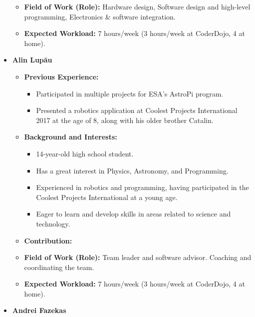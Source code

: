 \documentclass[11pt]{article}
\begin{document}
\begin{itemize}
\begin{itemize}[label=]
        \item[\faMicroscope] \textbf{Field of Work (Role):} Hardware design, Software design and high-level programming, Electronics \& software integration.
        \item[\faLaptopCode] \textbf{Expected Workload:} 7 hours/week (3 hours/week at CoderDojo, 4 at home).
    \end{itemize}
    \vspace{0.2 cm}
    \item[] \textbf{Alin Lup\u{a}u}
    \begin{itemize}[label=]
        \item[\faCogs] \textbf{Previous Experience:} 
        \begin{itemize}[label=]
            \item Participated in multiple projects for ESA's AstroPi program.
            \item Presented a robotics application at Coolest Projects International 2017 at the age of 8, along with his older brother Catalin.
        \end{itemize}
        \item[\faGraduationCap] \textbf{Background and Interests:} 
        \begin{itemize}[label=]
            \item 14-year-old high school student.
            \item Has a great interest in Physics, Astronomy, and Programming.
            \item Experienced in robotics and programming, having participated in the Coolest Projects International at a young age.
            \item Eager to learn and develop skills in areas related to science and technology.
        \end{itemize}
        \item[\faEdit] \textbf{Contribution:} 
        \item[\faMicroscope] \textbf{Field of Work (Role):} Team leader and software advisor. Coaching and coordinating the team.
        \item[\faLaptopCode] \textbf{Expected Workload:} 7 hours/week (3 hours/week at CoderDojo, 4 at home).
    \end{itemize}
    \vspace{0.2 cm}
    \item[] \textbf{Andrei Fazekas}
    \begin{itemize}[label=]

\end{itemize}
\end{itemize}
\end{document}
